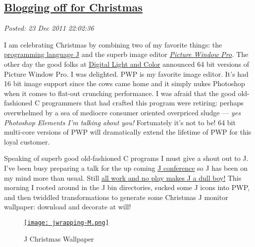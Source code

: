 %

\subsection*{\href{https://bakerjd99.wordpress.com/2011/12/23/blogging-off-for-christmas/}{Blogging off for Christmas}}


\noindent\emph{Posted: 23 Dec 2011 22:02:36}
\vspace{6pt}



I am celebrating Christmas by combining two of my favorite things: the
\href{http://www.jsoftware.com/}{programming language J} and the superb
image editor \emph{\href{http://www.dl-c.com/}{Picture Window Pro}.} The
other day the good folks at \href{http://www.dl-c.com/}{Digital Light
and Color} announced 64 bit versions of Picture Window Pro. I was
delighted. PWP is my favorite image editor. It's had 16 bit image
support since the cows came home and it simply nukes Photoshop when it
comes to flat-out crunching performance. I was afraid that the good
old-fashioned C programmers that had crafted this program were retiring:
perhaps overwhelmed by a sea of mediocre consumer oriented overpriced
sludge --- \emph{yes Photoshop Elements I'm talking about
you!} Fortunately it's not to be! 64 bit multi-core versions of PWP will
dramatically extend the lifetime of PWP for this loyal customer.

Speaking of superb good old-fashioned C programs I must give a shout out
to J. I've been busy preparing a talk for the up coming
\href{http://www.jsoftware.com/jwiki/Community/Conference2012}{J
conference} so J has been on my mind more than usual. Still
\href{http://www.youtube.com/watch?v=NgMdz2fe0CY}{all work and no play
makes J a dull boy!} This morning I rooted around in the J bin
directories, sucked some J icons into PWP, and then twiddled
transformations to generate some Christmas J monitor wallpaper: download
and decorate at will!


\captionsetup[figure]{labelformat=empty}
\begin{figure}[htbp]
\centering
\href{http://conceptcontrol.smugmug.com/Themes/Manipulations/Image-Hacking-1/7387395\_SCSNdg}{\texttt{[image: jwrapping-M.png]}}
\caption{J  Christmas  Wallpaper}
\label{fig:2315X0}
\end{figure}




%